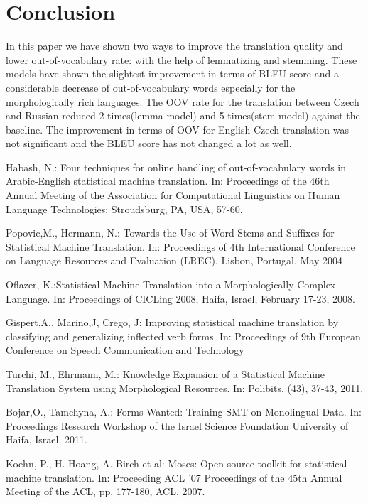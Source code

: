 \documentclass[11pt,letterpaper]{article}
\begin{document}
\section{Conclusion}
In this paper we have shown two ways to improve the translation quality and lower out-of-vocabulary rate:
with the help of lemmatizing and stemming. These models have shown the slightest improvement in terms of BLEU
score and a considerable decrease of out-of-vocabulary words especially for the morphologically rich languages. 
The OOV rate for the translation between Czech and Russian reduced 2 times(lemma model) and 5 times(stem model) 
against the baseline. The improvement in terms of OOV for English-Czech translation was not
significant and the BLEU score has not changed a lot as well.


\begin{thebibliography}{4} 


 Habash, N.: Four techniques for online handling of out-of-vocabulary words in 
Arabic-English statistical machine translation. In: Proceedings of the 46th Annual Meeting of 
the Association for Computational Linguistics on Human Language Technologies:
Stroudsburg, PA, USA, 57-60.

 Popovic,M., Hermann, N.: Towards the Use of Word Stems and Suffixes for Statistical Machine Translation. 
In: Proceedings of 4th International Conference on Language Resources and Evaluation (LREC), Lisbon, Portugal, May 2004 

 Oflazer, K.:Statistical Machine Translation into a Morphologically Complex Language. 
In: Proceedings of CICLing 2008, Haifa, Israel, February 17-23, 2008. 

 Gispert,A., Marino,J, Crego, J: Improving statistical machine translation by classifying and generalizing inflected verb forms.  
In: Proceedings of 9th European Conference on Speech Communication and Technology

 Turchi, M., Ehrmann, M.: Knowledge Expansion of a Statistical Machine Translation System using Morphological Resources. 
In: Polibits, (43), 37-43, 2011.

 Bojar,O., Tamchyna, A.: Forms Wanted: Training SMT on Monolingual Data.
In: Proceedings Research Workshop of the Israel Science Foundation University of Haifa, Israel. 2011.

Koehn, P., H. Hoang, A. Birch et al: Moses: Open source toolkit for statistical machine translation.
In: Proceeding ACL '07 Proceedings of the 45th Annual Meeting of the ACL, pp. 177-180, ACL, 2007.

\end{thebibliography}
\end{document}
